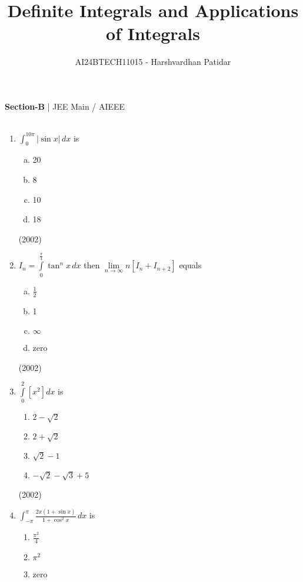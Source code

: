 \documentclass[journal,12pt,twocolumn]{IEEEtran}
\theoremstyle{remark}
\begin{document}

\vspace{3cm}

\title{Definite Integrals and Applications of Integrals}
\author{AI24BTECH11015 - Harshvardhan Patidar}
\maketitle
\newpage
\bigskip

\renewcommand{\thefigure}{\theenumi}
\renewcommand{\thetable}{\theenumi}


\textbf{Section-B} | JEE Main / AIEEE \\ \\
\begin{enumerate}[1.]
	\item 
		$\int_0^{10\pi} | \sin x| \, dx$ is  
		\begin{enumerate} [(a)]
			\item 20\item 8\item 10\item 18
		\end{enumerate} 
		\hfill (2002)
	\item
			$I_n = \int \limits_{0}^{\frac{\pi}{4}} \tan^n x \, dx$ then $\lim \limits_{n \to \infty} n[I_n + I_{n+2}]$ equals 
				\begin{enumerate} [(a)]
					\item $\frac{1}{2}$
	 				\item 1
					\item $\infty$
					\item zero
	 			\end{enumerate}
				\hfill(2002)
	\item
		$ \int \limits_0^2 [x^2]dx $ is  
			\begin{enumerate}
				\item $2-\sqrt2$
				 \item $2+\sqrt2$
				\item $\sqrt2 - 1$
				\item $-\sqrt2 - \sqrt3 + 5$
			\end{enumerate}
			\hfill (2002)
	\item 
		$ \int_{-\pi}^{\pi} \frac{2x(1 + \sin x)}{1+\cos^2 x} \, dx$ is
			\begin{enumerate}
					\item $\frac{\pi^2}{4}$
					\item $\pi^2$
					\item zero

\end{enumerate}
\end{enumerate}
\end{document}
